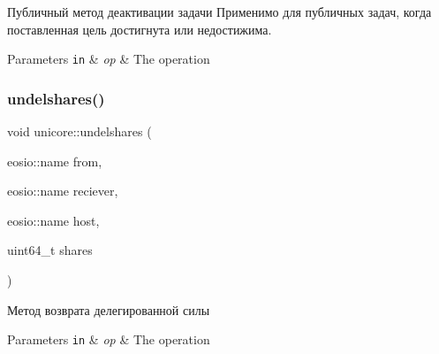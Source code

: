 Публичный метод деактивации задачи Применимо для публичных задач, когда поставленная цель достигнута или недостижима. 


\begin{DoxyParams}[1]{Parameters}
\mbox{\tt in}  & {\em op} & The operation \\
\hline
\end{DoxyParams}
\mbox{\label{classunicore_a9464479eb5d28b6c7f9956319077b294}} 
\subsubsection{\texorpdfstring{undelshares()}{undelshares()}}
{\footnotesize\ttfamily void unicore\+::undelshares (\begin{DoxyParamCaption}\item[{eosio\+::name}]{from,  }\item[{eosio\+::name}]{reciever,  }\item[{eosio\+::name}]{host,  }\item[{uint64\+\_\+t}]{shares }\end{DoxyParamCaption})}



Метод возврата делегированной силы 


\begin{DoxyParams}[1]{Parameters}
\mbox{\tt in}  & {\em op} & The operation \\
\hline
\end{DoxyParams}
\mbox{\label{classunicore_adabf2b3d106784b146a047e35ceec410}} 
